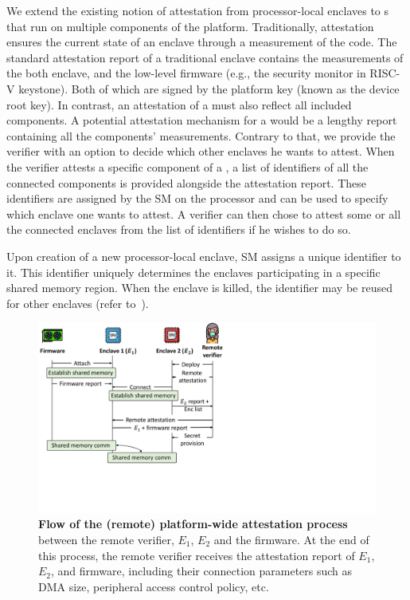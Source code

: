 We extend the existing notion of attestation from processor-local enclaves to \nameenclave{}s that run on multiple components of the platform. Traditionally, attestation ensures the current state of an enclave through a measurement of the code. The standard attestation report of a traditional enclave contains the measurements of the both enclave, and the low-level firmware (e.g., the security monitor in RISC-V keystone). Both of which are signed by the platform key (known as the device root key). In contrast, an attestation of a \nameenclave{} must also reflect all included components. 
A potential attestation mechanism for a \nameenclave{} would be a lengthy report containing all the components' measurements. %
Contrary to that, we provide the verifier with an option to decide which other enclaves he wants to attest. When the verifier attests a specific component of a \nameenclave, a list of identifiers of all the connected components is provided alongside the attestation report. These identifiers are assigned by the SM on the processor and can be used to specify which enclave one wants to attest. A verifier can then chose to attest some or all the connected enclaves from the list of identifiers if he wishes to do so.


Upon creation of a new processor-local enclave, SM assigns a unique identifier to it. This identifier uniquely determines the enclaves participating in a specific shared memory region. When the enclave is killed, the identifier may be reused for other enclaves (refer to~).


\begin{figure}[t]
  \centering
  \includegraphics[trim={0 5cm 15cm 0}, clip, width=.8\linewidth]{chapters/PIE/images/localAttestation.pdf}
  \caption[Flow of (remote) platform-wide attestation process between \nameenclave{}'s components]{\textbf{Flow of the (remote) platform-wide attestation process} between the remote verifier, $E_1$, $E_2$ and the \sphw firmware. At the end of this process, the remote verifier receives the attestation report of $E_1$, $E_2$, and \sphw firmware, including their connection parameters such as DMA size, peripheral access control policy, etc.}   
  \label{fig:attestationFlow}
\end{figure}

